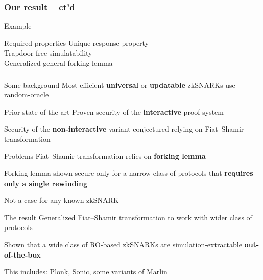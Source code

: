 \documentclass[aspectratio=169,handout]{beamer}
\renewcommand{\emph}[1]{\textbf{#1}}
\begin{document}
\begin{frame}
  \frametitle{Our result -- ct'd}
  \begin{block}{Example}
  \end{block}
  \begin{block}{Required properties}
    Unique response property\\
    Trapdoor-free simulatability\\
    Generalized general forking lemma
  \end{block}
\end{frame}

\begin{frame}
  \frametitle{}
\end{frame}

\begin{frame}
  \begin{block}{Some background}
    Most efficient \emph{universal} or \emph{updatable} zkSNARKs use random-oracle
  \end{block}\pause  

  \begin{block}{Prior state-of-the-art}
    Proven security of the \emph{interactive} proof system

    Security of the \emph{non-interactive} variant conjectured
      relying on Fiat--Shamir transformation
  \end{block}\pause

  \begin{block}{Problems}
    Fiat--Shamir transformation relies on \emph{forking lemma}

    Forking lemma shown secure only for a narrow class of protocols
    that \emph{requires only a single rewinding}

    Not a case for any known zkSNARK
  \end{block}\pause

  \begin{block}{The result}
    Generalized Fiat--Shamir transformation to work with wider class of protocols
    
     Shown that a wide class of RO-based zkSNARKs are
     simulation-extractable \emph{out-of-the-box}
     
     This includes: Plonk, Sonic, some variants of Marlin
  \end{block}
\end{frame}
\end{document}
